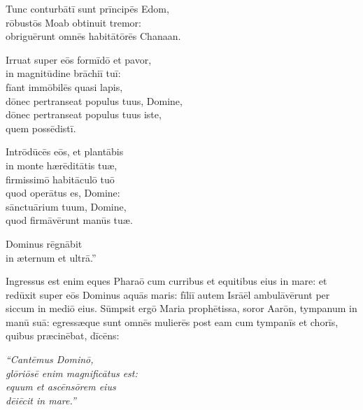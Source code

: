\begin{flushleft}
{Tunc conturbātī sunt prīncipēs Edom,\\
rōbustōs Moab obtinuit tremor:\\
obriguērunt omnēs habitātōrēs Chanaan.

Irruat super eōs formīdō et pavor,\\
in magnitūdine brāchiī tuī:\\
fīant immōbilēs quasi lapis,\\
dōnec pertranseat populus tuus, Domine,\\
dōnec pertranseat populus tuus iste,\\
quem possēdistī.

Intrōdūcēs eōs, et plantābis\\
in monte hærēditātis tuæ,\\
firmissimō habitāculō tuō\\
quod operātus es, Domine:\\
sānctuārium tuum, Domine,\\
quod firmāvērunt manūs tuæ.

Dominus rēgnābit\\
in æternum et ultrā.''
}
\end{flushleft}

Ingressus est enim eques Pharaō
cum curribus et equitibus eius in mare: et redūxit super eōs Dominus aquās
maris: fīliī autem Isrāēl ambulāvērunt per siccum in mediō eius. 
Sūmpsit ergō Maria prophētissa, soror Aarōn, tympanum in
manū suā: egressæque sunt omnēs mulierēs post eam cum
tympanīs et chorīs, quibus
præcinēbat, dīcēns: 

\begin{flushleft}
{\it
``Cantēmus Dominō,\\
glōriōsē enim magnificātus est:\\
equum et ascēnsōrem eius\\
dēiēcit in mare.''
}
\end{flushleft}

